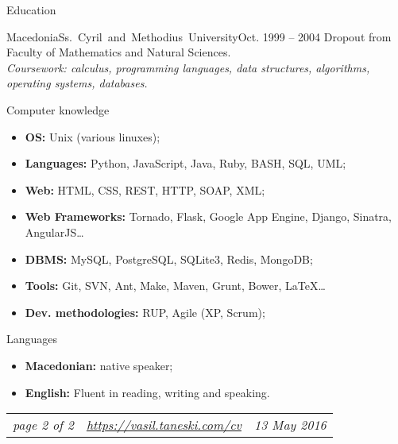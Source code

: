 \documentclass[]{mcdowellcv}
\begin{document}
    \begin{cvsection}{Education}
    \label{Education}
        \begin{cvsubsection}{Macedonia}{\mbox{Ss. Cyril and Methodius University}}{Oct. 1999 -- 2004}
            Dropout from Faculty of Mathematics and Natural Sciences.
            \\ \textit{Coursework: calculus, programming languages, data structures, algorithms, operating systems, databases.}
        \end{cvsubsection}
    \end{cvsection}

    \begin{cvsection}{Computer knowledge}
    \label{Computer knowledge}
        \begin{cvsubsection}{}{}{}
            \begin{itemize}
                \item \textbf{OS:} Unix (various linuxes);
                \item \textbf{Languages:} Python, JavaScript, Java, Ruby, BASH, SQL, UML;
                \vspace{1mm}
                \item \textbf{Web:} HTML, CSS, REST, HTTP, SOAP, XML;
                \item \textbf{Web Frameworks:} Tornado, Flask, Google App Engine, Django, Sinatra, AngularJS\ldots
                \vspace{1mm}
                \item \textbf{DBMS:} MySQL, PostgreSQL, SQLite3, Redis, MongoDB;
                \item \textbf{Tools:} Git, SVN, Ant, Make, Maven, Grunt, Bower, \LaTeX\ldots
                \vspace{1mm}
                \item \textbf{Dev. methodologies:} RUP, Agile (XP, Scrum);
            \end{itemize}
        \end{cvsubsection}
    \end{cvsection}

    \begin{cvsection}{Languages}
    \label{Languages}
        \begin{cvsubsection}{}{}{}
            \begin{itemize}
                \item \textbf{Macedonian:} native speaker;
                \item \textbf{English:} Fluent in reading, writing and speaking.
            \end{itemize}
        \end{cvsubsection}
    \end{cvsection}
    \vfill
    \begin{tabu} to 1\textwidth {X[l,m] X[c,m] X[r,m]}
        \textit{page 2 of 2} &
        \textit{\url{https://vasil.taneski.com/cv}} &
        \textit{13 May 2016}
    \end{tabu}
    \clearpage
\end{document}
